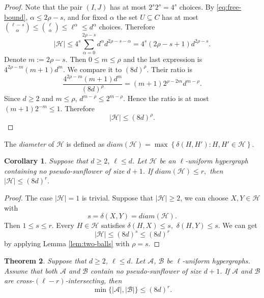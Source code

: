 \documentclass[11pt]{article}
\numberwithin{equation}{section}
\newtheorem{theorem}{Theorem}[section]
\newtheorem{corollary}[theorem]{Corollary}
\begin{document}
\begin{proof}
		Note that the pair $(I,J)$ has at most $2^s2^s=4^s$ choices.  By \eqref{eq:free-bound}, $\alpha\le 2\rho-s$, and for fixed $\alpha$ the set $U\subseteq C$ has at most
		$
		\binom{\ell-s}{\alpha}\le\binom{\ell}{\alpha}\le \ell^\alpha\le d^\alpha
		$
		choices.  Therefore
		\[
		|\mathcal H|
		\le
		4^s\sum_{\alpha=0}^{2\rho-s} d^\alpha d^{2\rho-s-\alpha}
		=
		4^s(2\rho-s+1)d^{2\rho-s}.
		\]
		Denote
		$
		m:=2\rho-s.
		$
		Then $0\le m\le \rho$ and the last expression is
		$
		4^{2\rho-m}(m+1)d^m.
		$
		We compare it to $(8d)^\rho$.  Their ratio is
		\[
		\frac{4^{2\rho-m}(m+1)d^m}{(8d)^\rho}
		=
		(m+1)2^{\rho-2m}d^{m-\rho}.
		\]
		Since $d\ge 2$ and $m\le \rho$,
		$
		d^{m-\rho}\le 2^{m-\rho}.
		$
		Hence the ratio is at most
		$
		(m+1)2^{-m}\le 1.
		$
		Therefore
		\[
		|\mathcal H|\le (8d)^\rho.
		\]
	\end{proof}
	The \emph{diameter} of $\mathcal{H}$ is defined as $ diam(\mathcal{H})=\max\left\{\delta(H,H'):H,H'\in \mathcal{H}\right\}$.
	\begin{corollary}\label{cor:small-diameter}
		Suppose that $d\ge 2$, $\ell\le d$. Let $\mathcal H$ be an $\ell$-uniform hypergraph containing no pseudo-sunflower of size $d+1$.  If
		$
		diam(\mathcal{H})\le r,
	$
		then
		$
		|\mathcal H|\le (8d)^r.
		$
	\end{corollary}
	\begin{proof}
		The case $|\mathcal H|=1$ is trivial.  Suppose that $|\mathcal H|\ge2$, we can choose $X,Y\in\mathcal H$ with
		\[
		s=\delta(X,Y)=diam(\mathcal H).
		\]
		Then $1\le s\le r$.  Every $H\in\mathcal H$ satisfies
		$
		\delta(H,X)\le s,
		$ $
		\delta(H,Y)\le s.
		$
	We can get
		\[
		|\mathcal H|\le (8d)^s\le (8d)^r
		\] by applying Lemma \ref{lem:two-balls} with $\rho=s$.
	\end{proof}
	\begin{theorem}\label{thm:compression}
		Suppose that $d\ge 2$, $\ell\le d$. Let $\mathcal{A}$, $\mathcal{B}$ be $\ell$-uniform hypergraphs.
		Assume that both $\mathcal A$ and $\mathcal B$ contain no pseudo-sunflower of size $d+1$.  If $\mathcal A$ and $\mathcal B$ are cross-$(\ell-r)$-intersecting,
		then
		\[
		\min\{|\mathcal A|,|\mathcal B|\}\le (8d)^r.
		\]
	\end{theorem}
	
\end{document}
